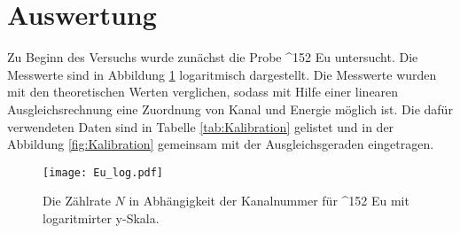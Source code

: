 \newpage
\section{Auswertung}

Zu Beginn des Versuchs wurde zunächst die Probe {}^152 Eu untersucht. Die Messwerte
sind in Abbildung \ref{fig:Eu_log} logaritmisch dargestellt. Die Messwerte
wurden mit den theoretischen Werten verglichen, sodass mit Hilfe einer linearen Ausgleichsrechnung
eine Zuordnung von Kanal und Energie möglich ist. Die dafür verwendeten Daten sind
in Tabelle \ref{tab:Kalibration} gelistet und in der Abbildung \ref{fig:Kalibration}
gemeinsam mit der Ausgleichsgeraden eingetragen.

\begin{figure}
 \centering
 \texttt{[image: Eu\_log.pdf]}
 \caption{Die Zählrate $N$ in Abhängigkeit der Kanalnummer für {}^152 Eu mit logaritmirter y-Skala.}
 \label{fig:Eu_log}
\end{figure}


\label{sec:Auswertung}


